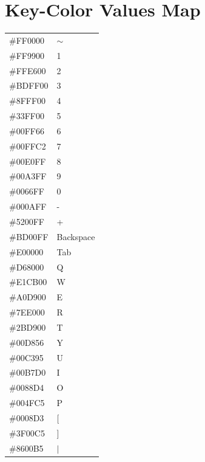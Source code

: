 \documentclass{report}
\begin{document}
\newpage
\appendix

\twocolumn
\chapter{Key-Color Values Map}
\label{appendix:key-map}

\centering
\begin{supertabular}{ll}
	\#FF0000 & $\sim$            \\
	\#FF9900 & 1                 \\
	\#FFE600 & 2                 \\
	\#BDFF00 & 3                 \\
	\#8FFF00 & 4                 \\
	\#33FF00 & 5                 \\
	\#00FF66 & 6                 \\
	\#00FFC2 & 7                 \\
	\#00E0FF & 8                 \\
	\#00A3FF & 9                 \\
	\#0066FF & 0                 \\
	\#000AFF & -                 \\
	\#5200FF & +                 \\
	\#BD00FF & Backspace         \\

	\#E00000 & Tab               \\
	\#D68000 & Q								 \\
	\#E1CB00 & W								 \\
	\#A0D900 & E								 \\
	\#7EE000 & R								 \\
	\#2BD900 & T								 \\
	\#00D856 & Y								 \\
	\#00C395 & U								 \\
	\#00B7D0 & I								 \\
	\#0088D4 & O								 \\
	\#004FC5 & P								 \\
	\#0008D3 & [								 \\
			\#3F00C5 & ]								 \\
	\#8600B5 & $\vert$					 \\


\end{supertabular}
\end{document}
